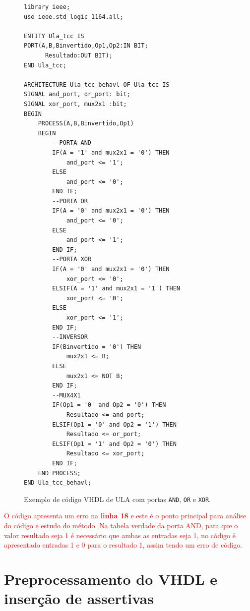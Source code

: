 \begin{figure}[H]
\caption{\label{fig:code_exemplo} Exemplo de código VHDL de ULA com portas \texttt{AND}, \texttt{OR} e \texttt{XOR}.}
	\begin{center}
    \begin{minipage}{0.7\textwidth}
    \begin{lstlisting}       
library ieee;
use ieee.std_logic_1164.all;

ENTITY Ula_tcc IS
PORT(A,B,Binvertido,Op1,Op2:IN BIT;
	  Resultado:OUT BIT);
END Ula_tcc;

ARCHITECTURE Ula_tcc_behavl OF Ula_tcc IS
SIGNAL and_port, or_port: bit;
SIGNAL xor_port, mux2x1 :bit;
BEGIN
	PROCESS(A,B,Binvertido,Op1)
	BEGIN
		--PORTA AND
		IF(A = '1' and mux2x1 = '0') THEN
		    and_port <= '1';
		ELSE
		    and_port <= '0';
		END IF;
		--PORTA OR
		IF(A = '0' and mux2x1 = '0') THEN
		    and_port <= '0';
		ELSE
		    and_port <= '1';
		END IF;
		--PORTA XOR
		IF(A = '0' and mux2x1 = '0') THEN
		    xor_port <= '0';
		ELSIF(A = '1' and mux2x1 = '1') THEN
		    xor_port <= '0';
		ELSE
		    xor_port <= '1';
		END IF;
		--INVERSOR
		IF(Binvertido = '0') THEN
			mux2x1 <= B;
		ELSE
			mux2x1 <= NOT B;
		END IF;
		--MUX4X1
		IF(Op1 = '0' and Op2 = '0') THEN
			Resultado <= and_port;
		ELSIF(Op1 = '0' and Op2 = '1') THEN
			Resultado <= or_port;
		ELSIF(Op1 = '1' and Op2 = '0') THEN
			Resultado <= xor_port;
		END IF;
	END PROCESS;
END Ula_tcc_behavl;
    \end{lstlisting}
    \end{minipage}
	\end{center}
\end{figure}

\textcolor{red}{O código apresenta um erro na \textbf{linha 18} e este é o ponto principal para análise do código e estudo do método. Na tabela verdade da porta AND, para que o valor resultado seja 1 é necessário que ambas as entradas seja 1, no código é apresentado entradas 1 e 0 para o resultado 1, assim tendo um erro de código.}

\section{Preprocessamento do VHDL e inserção de assertivas}
\label{cap:vhdl_assertivas}

